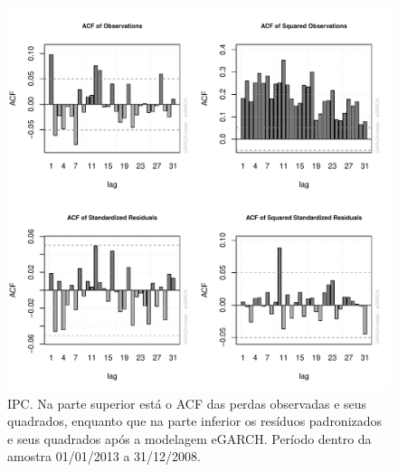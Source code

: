 \documentclass[review]{elsarticle}
\theoremstyle{definition}
\begin{document}
\begin{figure}[H]
	\centering
	\includegraphics[width=1\linewidth]{figs/artigo-acf-IPC}
	\caption{IPC. Na parte superior está o ACF das perdas observadas e seus quadrados, enquanto que na parte inferior os resíduos padronizados e seus quadrados após a modelagem eGARCH. Período dentro da amostra 01/01/2013 a 31/12/2008.}
	\label{fig:artigo-acf-ipc}
\end{figure}
\end{document}
